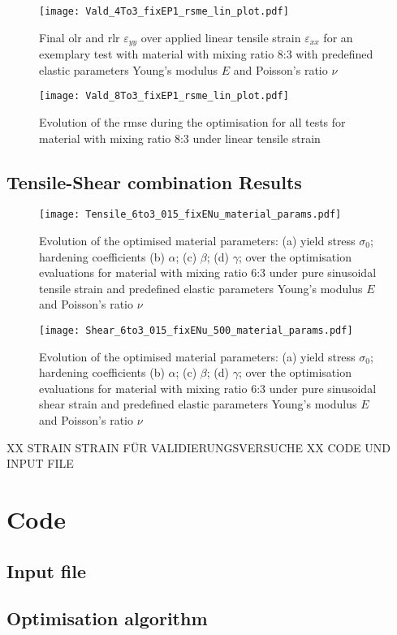 \begin{appendices}
    \begin{figure}[H]
    \centering
    \texttt{[image: Vald\_4To3\_fixEP1\_rsme\_lin\_plot.pdf]}
    \caption{Final \acrlong{olr} and \acrfull{rlr} $\varepsilon_{yy}$ over applied linear tensile strain $\varepsilon_{xx}$ for an exemplary test with material with mixing ratio 8:3 with predefined elastic parameters Young's modulus $E$ and Poisson's ratio $\nu$}
    \label{fig:strain_strain_8to3}
    \end{figure}

    \begin{figure}[H]
    \centering
    \texttt{[image: Vald\_8To3\_fixEP1\_rsme\_lin\_plot.pdf]}
    \caption{Evolution of the \acrfull{rmse} during the optimisation for all tests for material with mixing ratio 8:3 under linear tensile strain}
    \label{fig:verfifRMSE83}
    \end{figure}


    \section{Tensile-Shear combination Results} \label{app:tensileShearResults}
    \begin{figure}[H]
    \centering
    \texttt{[image: Tensile\_6to3\_015\_fixENu\_material\_params.pdf]}
    \caption{Evolution of the optimised material parameters: (a) yield stress $\sigma_0$; hardening coefficients (b) $\alpha$; (c) $\beta$; (d) $\gamma$; over the optimisation evaluations for material with mixing ratio 6:3 under pure sinusoidal tensile strain and predefined elastic parameters Young's modulus $E$ and Poisson's ratio $\nu$}
    \label{fig:tensileMatParams}
    \end{figure}

    \begin{figure}[H]
    \centering
    \texttt{[image: Shear\_6to3\_015\_fixENu\_500\_material\_params.pdf]}
    \caption{Evolution of the optimised material parameters: (a) yield stress $\sigma_0$; hardening coefficients (b) $\alpha$; (c) $\beta$; (d) $\gamma$; over the optimisation evaluations for material with mixing ratio 6:3 under pure sinusoidal shear strain and predefined elastic parameters Young's modulus $E$ and Poisson's ratio $\nu$}
    \label{fig:shearMatParams}
    \end{figure}


    XX STRAIN STRAIN FÜR VALIDIERUNGSVERSUCHE
    XX CODE UND INPUT FILE
    \chapter{Code} \label{app:Code}
    \section{Input file} \label{app:inputFile}
    \section{Optimisation algorithm}\label{app:Script}

\end{appendices}